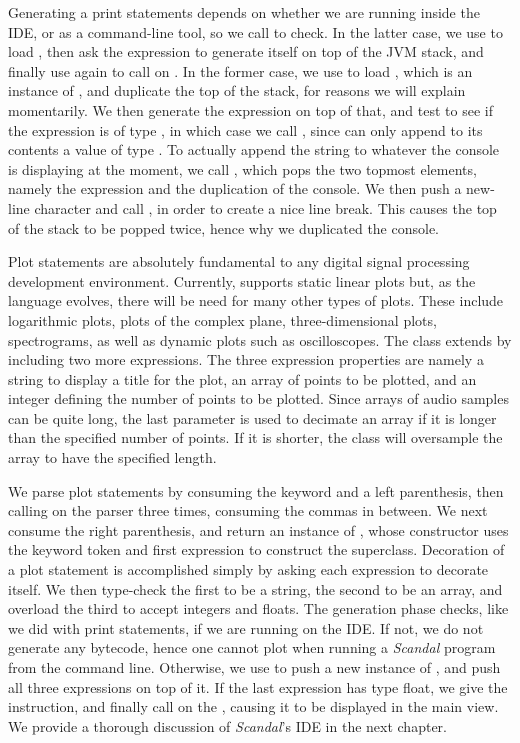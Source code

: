 Generating a print statements depends on whether we are running inside the IDE, or as a command-line tool, so we call  to check. In the latter case, we use  to load , then ask the expression to generate itself on top of the JVM stack, and finally use  again to call  on . In the former case, we use  to load , which is an instance of , and duplicate the top of the stack, for reasons we will explain momentarily. We then generate the expression on top of that, and test to see if the expression is of type , in which case we call , since  can only append to its contents a value of type . To actually append the string to whatever the console is displaying at the moment, we call , which pops the two topmost elements, namely the expression and the duplication of the console. We then push a new-line character and call , in order to create a nice line break. This causes the top of the stack to be popped twice, hence why we duplicated the console.

Plot statements are absolutely fundamental to any digital signal processing development environment. Currently,  supports static linear plots but, as the language evolves, there will be need for many other types of plots. These include logarithmic plots, plots of the complex plane, three-dimensional plots, spectrograms, as well as dynamic plots such as oscilloscopes. The  class extends  by including two more expressions. The three expression properties are namely a string to display a title for the plot, an array of points to be plotted, and an integer defining the number of points to be plotted. Since arrays of audio samples can be quite long, the last parameter is used to decimate an array if it is longer than the specified number of points. If it is shorter, the  class will oversample the array to have the specified length.

We parse plot statements by consuming the keyword and a left parenthesis, then calling  on the parser three times, consuming the commas in between. We next consume the right parenthesis, and return an instance of , whose constructor uses the keyword token and first expression to construct the superclass. Decoration of a plot statement is accomplished simply by asking each expression to decorate itself. We then type-check the first to be a string, the second to be an array, and overload the third to accept integers and floats. The generation phase checks, like we did with print statements, if we are running on the IDE. If not, we do not generate any bytecode, hence one cannot plot when running a \emph{Scandal} program from the command line. Otherwise, we use  to push a new instance of , and push all three expressions on top of it. If the last expression has type float, we give the  instruction, and finally call  on the , causing it to be displayed in the main view. We provide a thorough discussion of \emph{Scandal}'s IDE in the next chapter.

